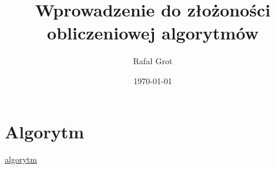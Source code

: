 \documentclass[11pt]{article}
\author{Rafał Grot}
\date{\today}
\title{Wprowadzenie do złożoności obliczeniowej algorytmów}
\begin{document}
\maketitle
\tableofcontents

\section{Algorytm}
\label{sec:orga96de1e}
\url{algorytm}
\end{document}
